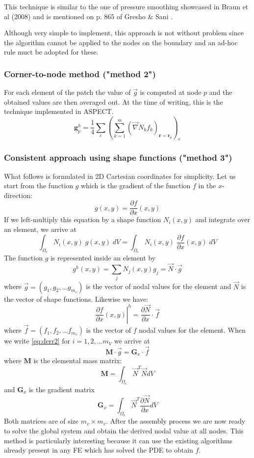 This technique is similar to the one of pressure smoothing showcased 
in Braun et al (2008) \cite{brtf08}
and is mentioned on p. 865 of Gresho \& Sani \cite{grsa}.

Although very simple to implement, this approach is not without problem since 
the algorithm cannot be applied to the nodes on the boundary and an ad-hoc 
rule muct be adopted for these. 


\subsubsection{Corner-to-node method ("method 2")}

For each element of the patch the value of $\vec g$ is computed at node $p$ and the obtained
values are then averaged out. At the time of writing, this is the technique implemented in  
ASPECT.
\[
\bm g_p^h = \frac{1}{4} \sum_{e} \left( \sum_{k=1}^m  (\vec\nabla N_k f_k)_{\bm r=\bm r_p} \right)_e
\]


\subsubsection{Consistent approach using shape functions ("method 3")}

What follows is formulated in 2D Cartesian coordinates for simplicity. 
Let us start from the function $g$ which is the gradient of the function $f$
in the $x$-direction:
\[
g(x,y) = \frac{\partial f}{\partial x}(x,y)
\]
If we left-multiply this equation by a shape function $N_i(x,y)$ 
and integrate over an element, we arrive at 
\begin{equation}
\int_{\Omega_e} N_i(x,y)\; g(x,y)\; dV =
\int_{\Omega_e} N_i(x,y)\; \frac{\partial f}{\partial x}(x,y)\; dV
\label{eq:derr2}
\end{equation}
The function $g$ is represented inside an element by
\[
g^h(x,y) = \sum_j N_j(x,y) g_j = \vec{N} \cdot \vec{g}
\]
where $\vec{g}=(g_1,g_2,\dots g_{m_v})$ is the vector of nodal values for the element
and $\vec{N}$ is the vector of shape functions.
Likewise we have:
\[
\left. \frac{\partial f}{\partial x}(x,y) \right|^h = \frac{\partial \vec{N}}{\partial x}\cdot \vec{f}
\]
where $\vec{f}=(f_1,f_2,\dots f_{m_v})$ is the vector of $f$ nodal values for the element.
When we write \eqref{eq:derr2} for $i=1,2,...m_V$ we arrive at
\[
{\bm M}\cdot \vec{g} = {\bm G}_x\cdot \vec{f}
\]
where ${\bm M}$ is the elemental mass matrix:
\[
{\bm M}=\int_{\Omega_e} \vec{N}^T \vec{N} dV
\]
and ${\bm G}_x$ is the gradient matrix 
\[
{\bm G}_x=\int_{\Omega_e} \vec{N}^T \frac{\partial \vec{N}}{\partial x} dV
\]
Both matrices are of size $m_v \times m_v$.
After the assembly process we are now ready to solve the global system and obtain
the derived nodal value at all nodes. 
This method is particularly interesting because it can use the existing algorithms 
already present in any FE which has solved the PDE to obtain $f$.  

